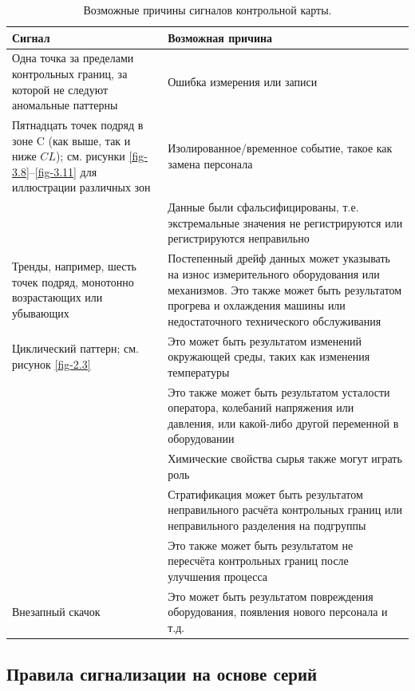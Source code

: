 \begin{table}[htbp]
	\centering
	\caption{Возможные причины сигналов контрольной карты.}
	\label{tab:3.8}
	\renewcommand{\arraystretch}{1.2}
	\begin{tabular}{p{6.5cm}p{7cm}}
		\toprule
		Сигнал & Возможная причина \\
		\midrule
		Одна точка за пределами контрольных границ, за которой не следуют аномальные паттерны & Ошибка измерения или записи \\
		Пятнадцать точек подряд в зоне C (как выше, так и ниже \(CL\)); см. рисунки \ref{fig-3.8}–\ref{fig-3.11} для иллюстрации различных зон & Изолированное/временное событие, такое как замена персонала \\
		& Данные были сфальсифицированы, т.е. экстремальные значения не регистрируются или регистрируются неправильно \\
		Тренды, например, шесть точек подряд, монотонно возрастающих или убывающих & Постепенный дрейф данных может указывать на износ измерительного оборудования или механизмов. Это также может быть результатом прогрева и охлаждения машины или недостаточного технического обслуживания \\
		Циклический паттерн; см. рисунок \ref{fig-2.3} & Это может быть результатом изменений окружающей среды, таких как изменения температуры \\
		& Это также может быть результатом усталости оператора, колебаний напряжения или давления, или какой-либо другой переменной в оборудовании \\
		& Химические свойства сырья также могут играть роль \\
		& Стратификация может быть результатом неправильного расчёта контрольных границ или неправильного разделения на подгруппы \\
		& Это также может быть результатом не пересчёта контрольных границ после улучшения процесса \\
		Внезапный скачок & Это может быть результатом повреждения оборудования, появления нового персонала и т.д. \\
		\bottomrule
	\end{tabular}
\end{table}

\subsection{Правила сигнализации на основе серий}

